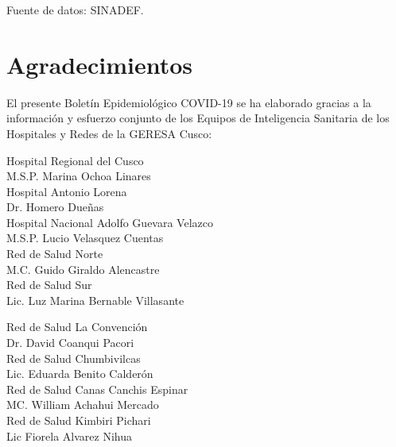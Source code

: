 \documentclass[12pt,a4paper,openany]{book}
\begin{document}
	\begin{table}[h]
		\resizebox{\textwidth}{!}{%
			
		}
		{\footnotesize {Fuente de datos: SINADEF.}}
	\end{table}
\pagebreak

	\section*{Agradecimientos}
		
	\centering
		{\large El presente Boletín Epidemiológico COVID-19 se ha elaborado gracias a la información y esfuerzo conjunto de los Equipos de Inteligencia Sanitaria de los Hospitales y Redes de la GERESA Cusco:

		\vspace{0.5cm}
		\noindent
		\begin{minipage}[t]{.45\textwidth}
			\centering
			Hospital Regional del Cusco \\
			M.S.P. Marina Ochoa Linares \vspace{0.5cm}\\
			Hospital Antonio Lorena \\
			Dr. Homero Dueñas \vspace{.5cm}\\
			Hospital Nacional Adolfo Guevara Velazco\\
			M.S.P. Lucio Velasquez Cuentas \vspace{.5cm}\\
			Red de Salud Norte \\
			M.C. Guido Giraldo Alencastre\vspace{0.5cm}\\
			Red de Salud Sur\\
			Lic. Luz Marina Bernable Villasante \vspace{0.5cm}\\	
		\end{minipage}
		\hfill
		\noindent
		\begin{minipage}[t]{.45\textwidth}
			\centering
			Red de Salud La Convención\\
			Dr. David Coanqui Pacori\vspace{0.5cm}\\
			Red de Salud Chumbivilcas\\
			Lic. Eduarda Benito Calderón \vspace{.5cm}\\
			Red de Salud Canas Canchis Espinar\\
			MC. William Achahui Mercado \vspace{.5cm}\\
			Red de Salud Kimbiri Pichari \\
			Lic Fiorela Alvarez Nihua\vspace{0.5cm}\\	
		\end{minipage}
}
\end{document}
